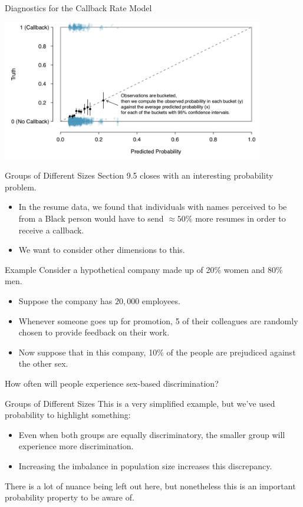 \begin{frame}{Diagnostics for the Callback Rate Model}
    \begin{center}
        \includegraphics[width=4.5in]{images/logdiag.png}
    \end{center}
\end{frame}

\begin{frame}{Groups of Different Sizes}
    Section 9.5 closes with an interesting probability problem.
    \begin{itemize}
        \item In the resume data, we found that individuals with names perceived to be from a Black person would have to send $\approx50\%$ more resumes in order to receive a callback.
        \item We want to consider other dimensions to this.
    \end{itemize}
\end{frame}

\begin{frame}{Example}
    Consider a hypothetical company made up of 20\% women and 80\% men.
    \begin{itemize}
        \item Suppose the company has $20,000$ employees.
        \item Whenever someone goes up for promotion, 5 of their colleagues are randomly chosen to provide feedback on their work.
        \item Now suppose that in this company, 10\% of the people are prejudiced against the other sex.
    \end{itemize}
    \vspace{12pt}How often will people experience sex-based discrimination?
\end{frame}

\begin{frame}{Groups of Different Sizes}
    This is a very simplified example, but we've used probability to highlight something:
    \begin{itemize}
        \item Even when both groups are equally discriminatory, the smaller group will experience more discrimination.
        \item Increasing the imbalance in population size increases this discrepancy. 
    \end{itemize}
    \vspace{12pt}There is a lot of nuance being left out here, but nonetheless this is an important probability property to be aware of.
\end{frame}

